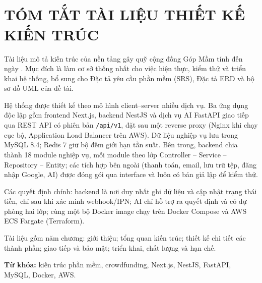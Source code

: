 \section*{\fontsize{18pt}{18pt}\selectfont\MakeUppercase{\de}\\TÓM TẮT TÀI LIỆU THIẾT KẾ KIẾN TRÚC}

Tài liệu mô tả kiến trúc của nền tảng gây quỹ cộng đồng Góp Mầm tính đến ngày \mocbaocao{}. Mục đích là làm cơ sở thống nhất cho việc hiện thực, kiểm thử và triển khai hệ thống, bổ sung cho Đặc tả yêu cầu phần mềm (SRS), Đặc tả ERD và bộ sơ đồ UML của đề tài.

Hệ thống được thiết kế theo mô hình client--server nhiều dịch vụ. Ba ứng dụng độc lập gồm frontend Next.js, backend NestJS và dịch vụ AI FastAPI giao tiếp qua REST API có phiên bản \texttt{/api/v1}, đặt sau một reverse proxy (Nginx khi chạy cục bộ, Application Load Balancer trên AWS). Dữ liệu nghiệp vụ lưu trong MySQL 8.4; Redis 7 giữ bộ đếm giới hạn tần suất. Bên trong, backend chia thành 18 module nghiệp vụ, mỗi module theo lớp Controller -- Service -- Repository -- Entity; các tích hợp bên ngoài (thanh toán, email, lưu trữ tệp, đăng nhập Google, AI) được đóng gói qua interface và luôn có bản giả lập để kiểm thử.

Các quyết định chính: backend là nơi duy nhất ghi dữ liệu và cập nhật trạng thái tiền, chỉ sau khi xác minh webhook/IPN; AI chỉ hỗ trợ ra quyết định và có dự phòng hai lớp; cùng một bộ Docker image chạy trên Docker Compose và AWS ECS Fargate (Terraform).

Tài liệu gồm năm chương: giới thiệu; tổng quan kiến trúc; thiết kế chi tiết các thành phần; giao tiếp và bảo mật; triển khai, chất lượng và hạn chế.

\textbf{Từ khóa:} kiến trúc phần mềm, crowdfunding, Next.js, NestJS, FastAPI, MySQL, Docker, AWS.

\newpage
